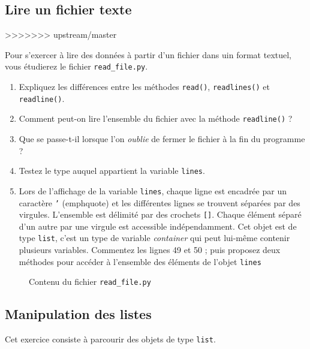 \subsection{Lire un fichier texte}
>>>>>>> upstream/master

Pour  s'exercer à  lire des données à partir d'un  fichier dans uin format textuel,
vous  étudierez le  fichier \texttt{read\_file.py}.

\begin{enumerate}

\item Expliquez  les différences  entre les  méthodes \texttt{read()},
  \texttt{readlines()} et \texttt{readline()}.

\item  Comment peut-on lire  l'ensemble  du fichier  avec la  méthode
  \texttt{readline()} ?

\item  Que se  passe-t-il lorsque  l'on \textit{oublie}  de fermer  le
  fichier à la fin du programme ?

\item Testez le type auquel appartient la variable \texttt{lines}.

\item Lors de l'affichage de  la variable \texttt{lines}, chaque ligne
  est encadrée par un caractère \texttt{'} (emph{quote}) et les différentes
  lignes se trouvent
  séparées par des  virgules. L'ensemble est délimité  par des crochets
  \texttt{[]}.  Chaque  élément séparé d'un autre par une  virgule est accessible
  indépendamment.  Cet objet est de  type \texttt{list}, c'est un type
  de  variable \emph{container}  qui  peut  lui-même  contenir   plusieurs  variables.
  Commentez  les lignes  49 et  50 ; puis proposez  deux méthodes  pour
  accéder à l'ensemble des éléments de l'objet \texttt{lines}

\end{enumerate}


\begin{figure}  
  
  \caption{Contenu du fichier \texttt{read\_file.py}}
  \label{stat_read_file}
\end{figure}



\subsection{Manipulation des listes}
Cet exercice consiste à parcourir des objets de type \texttt{list}.

